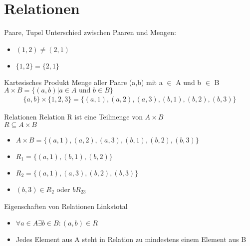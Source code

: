 \section{Relationen}

\begin{frame}{Paare, Tupel}
  Unterschied zwischen Paaren und Mengen:
  \begin{itemize}
    \item $(1,2)\neq(2,1)$
    \item $\{1,2\}=\{2,1\}$
  \end{itemize}
\end{frame}

\begin{frame}{Kartesisches Produkt}
  Menge aller Paare (a,b) mit a $\in$ A und b $\in$ B\\
  $A \times B = \{(a,b) | a \in A\text{ und }b \in B \}$
  \begin{align*}
    \{a,b\}\times\{1,2,3\}=\{(a,1),(a,2),(a,3),(b,1),(b,2),(b,3)\}
  \end{align*}
\end{frame}

\begin{frame}{Relationen}
  Relation R ist eine Teilmenge von $A\times B$ \\
  $R\subseteq A\times B$
  \begin{itemize}
    \item $A\times B=\{(a,1),(a,2),(a,3),(b,1),(b,2),(b,3)\}$
    \item $R_1=\{(a,1),(b,1),(b,2)\}$
    \item $R_2=\{(a,1),(a,3),(b,2),(b,3)\}$
    \item $(b,3)\in R_2$ oder $bR_23$
  \end{itemize}
\end{frame}

\begin{frame}{Eigenschaften von Relationen}
  Linkstotal
  \begin{itemize}
    \item $\forall a \in A \exists b \in B : (a,b)\in R$
    \item Jedes Element aus A steht in Relation zu mindestens einem Element aus B
  \end{itemize}
  \begin{center}
  \end{center}
\end{frame}


